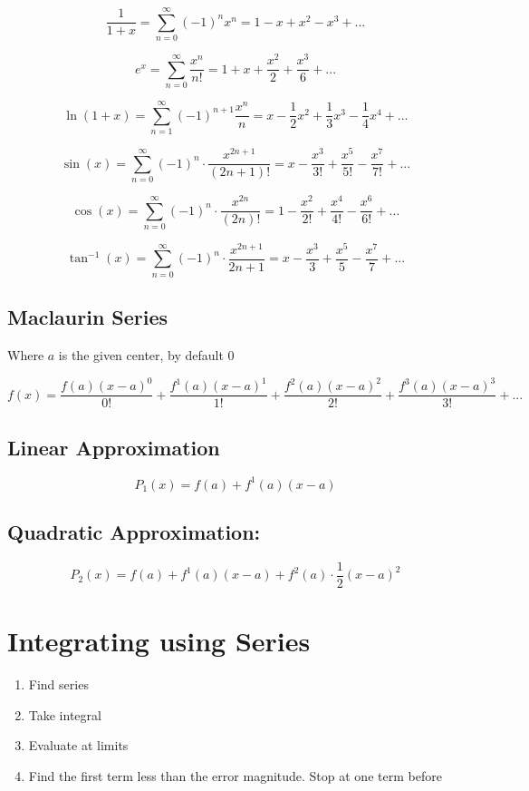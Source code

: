 \documentclass[12pt]{article}
\begin{document}
$$\frac{1}{1+x} = \sum_{n=0}^\infty (-1)^n x^n = 1-x+x^2-x^3+ ...$$

$$e^x = \sum_{n=0}^\infty \frac{x^n}{n!} = 1 + x + \frac{x^2}{2}+ \frac{x^3}{6}+ ...$$

$$\ln(1+x) =  \sum_{n=1}^\infty (-1)^{n+1} \frac{x^n}{n} = x-\frac{1}{2}x^2 + \frac{1}{3}x^3-\frac{1}{4}x^4+...$$

$$\sin(x) = \sum_{n=0}^\infty (-1)^n \cdot \frac{x^{2n+1}}{(2n+1)!} = x - \frac{x^3}{3!} + \frac{x^5}{5!} - \frac{x^7}{7!} + ...$$

$$\cos(x) = \sum_{n=0}^\infty (-1)^n \cdot \frac{x^{2n}}{(2n)!} = 1 - \frac{x^2}{2!} + \frac{x^4}{4!} - \frac{x^6}{6!} + ...$$


$$\tan^{-1}(x) = \sum_{n=0}^\infty (-1)^n \cdot \frac{x^{2n+1}}{2n+1} = x - \frac{x^3}{3}+ \frac{x^5}{5}- \frac{x^7}{7}+ ...$$

\subsection{Maclaurin  Series}
Where $a$ is the given center, by default 0

$$f(x) = \frac{f(a) (x-a)^0}{0!} +\frac{f^1(a) (x-a)^1}{1!} +\frac{f^2(a) (x-a)^2}{2!} +\frac{f^3(a) (x-a)^3}{3!} + ... $$

\subsection{Linear Approximation}

$$P_1 (x) = f(a) + f^1(a) (x-a)$$

\subsection{Quadratic Approximation:}

$$P_2 (x) = f(a) + f^1(a) (x-a) + f^2(a) \cdot \frac{1}{2} (x-a)^2$$


\section{Integrating using Series}
\begin{enumerate}
    \item Find series 
    \item Take integral
    \item Evaluate at limits
    \item Find the first term less than the error magnitude. Stop at one term before
\end{enumerate}
\end{document}
